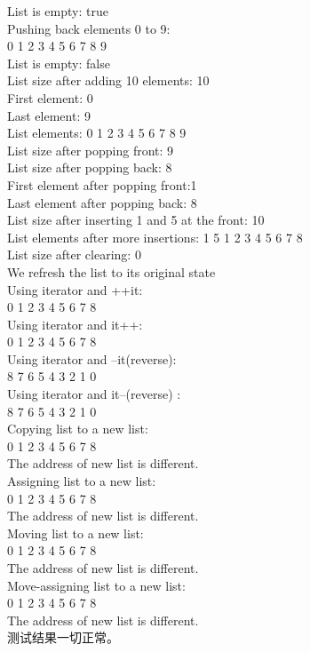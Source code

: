 \documentclass[UTF8]{ctexart}
\begin{document}
List is empty: true\\
Pushing back elements 0 to 9:\\
0 1 2 3 4 5 6 7 8 9 \\
List is empty: false\\
List size after adding 10 elements: 10\\
First element: 0\\
Last element: 9\\
List elements: 0 1 2 3 4 5 6 7 8 9 \\
List size after popping front: 9\\
List size after popping back: 8\\
First element after popping front:1\\
Last element after popping back: 8\\
List size after inserting 1 and 5 at the front: 10\\
List elements after more insertions: 1 5 1 2 3 4 5 6 7 8 \\
List size after clearing: 0\\
We refresh the list to its original state\\
Using iterator and ++it:\\
0 1 2 3 4 5 6 7 8 \\
Using iterator and it++:\\
0 1 2 3 4 5 6 7 8 \\
Using iterator and --it(reverse):\\
8 7 6 5 4 3 2 1 0\\
Using iterator and it--(reverse) :\\
8 7 6 5 4 3 2 1 0\\
Copying list to a new list:\\
0 1 2 3 4 5 6 7 8 \\
The address of new list is different.\\
Assigning list to a new list:\\
0 1 2 3 4 5 6 7 8 \\
The address of new list is different.\\
Moving list to a new list:\\
0 1 2 3 4 5 6 7 8 \\
The address of new list is different.\\
Move-assigning list to a new list:\\
0 1 2 3 4 5 6 7 8 \\
The address of new list is different.\\
测试结果一切正常。
\end{document}

